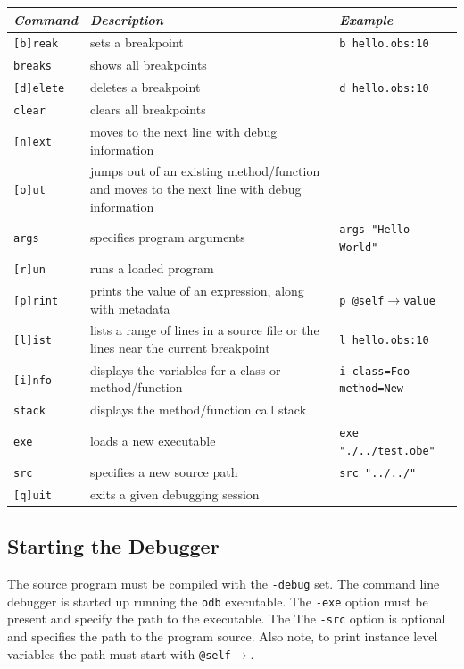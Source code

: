 \documentclass[12pt]{article}
\begin{document}
\begin{center}
\begin{tabular}{| l |p{4 cm} |p{6 cm} |}
\hline
\emph{Command} & \emph{Description} & \emph{Example} \\ \hline \hline
\texttt{[b]reak} &  sets a breakpoint & \texttt{b hello.obs:10} \\ \hline
\texttt{breaks} &  shows all breakpoints &  \\ \hline
\texttt{[d]elete} &  deletes a breakpoint & \texttt{d hello.obs:10} \\ \hline
\texttt{clear} &  clears all breakpoints &  \\ \hline
\texttt{[n]ext} &  moves to the next line with debug information &  \\ \hline
\texttt{[o]ut} &  jumps out of an existing method/function and moves to the next line with debug information &  \\ \hline
\texttt{args} &  specifies program arguments & \texttt{args "Hello World"} \\ \hline
\texttt{[r]un} &  runs a loaded program &  \\ \hline
\texttt{[p]rint} &  prints the value of an expression, along with metadata & \texttt{p @self$\rightarrow$value} \\ \hline
\texttt{[l]ist} &  lists a range of lines in a source file or the lines near the current breakpoint & \texttt{l hello.obs:10} \\ \hline
\texttt{[i]nfo} &  displays the variables for a class or method/function & \texttt{i class=Foo method=New} \\ \hline
\texttt{stack} &  displays the method/function call stack &  \\ \hline
\texttt{exe} &  loads a new executable & \texttt{exe "./../test.obe"} \\ \hline
\texttt{src} &  specifies a new source path & \texttt{src "../../"} \\ \hline
\texttt{[q]uit} &  exits a given debugging session &  \\ \hline
\end{tabular}
\end{center}

\subsection{Starting the Debugger}
The source program must be compiled with the \texttt{-debug} set. The command line debugger is started up running the \texttt{odb} executable. The \texttt{-exe} option must be present and specify the path to the executable.  The The \texttt{-src} option is optional and specifies the path to the program source.  Also note, to print instance level variables the path must start with \texttt{@self$\rightarrow$}. 
\end{document}
